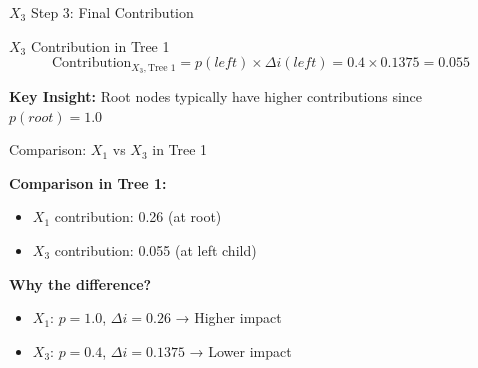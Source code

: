 \documentclass[10pt]{beamer}
\begin{document}
\begin{frame}{$X_3$ Step 3: Final Contribution}
\begin{examplebox}{$X_3$ Contribution in Tree 1}
$$\text{Contribution}_{X_3, \text{Tree 1}} = p(left) \times \Delta i(left) = 0.4 \times 0.1375 = 0.055$$
\end{examplebox}

\begin{alertbox}
\textbf{Key Insight:} Root nodes typically have higher contributions since $p(root) = 1.0$
\end{alertbox}
\end{frame}

\begin{frame}{Comparison: $X_1$ vs $X_3$ in Tree 1}
\begin{keypointsbox}
\textbf{Comparison in Tree 1:}
\begin{itemize}
\item $X_1$ contribution: 0.26 (at root)
\item $X_3$ contribution: 0.055 (at left child)
\end{itemize}
\end{keypointsbox}

\begin{examplebox}
\textbf{Why the difference?}
\begin{itemize}
\item $X_1$: $p = 1.0$, $\Delta i = 0.26$ → Higher impact
\item $X_3$: $p = 0.4$, $\Delta i = 0.1375$ → Lower impact
\end{itemize}
\end{examplebox}
\end{frame}
\end{document}
